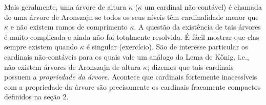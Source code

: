 \documentclass[a4paper]{article}
\theoremstyle{plain}\newtheorem{teo}{Teorema}[section]
\theoremstyle{plain}\newtheorem{prop}[teo]{Proposição}
\theoremstyle{plain}\newtheorem{lem}[teo]{Lema}
\theoremstyle{plain}\newtheorem{cor}[teo]{Corolário}
\theoremstyle{definition}\newtheorem{defi}[teo]{Definição}
\theoremstyle{remark}\newtheorem{rem}[teo]{Observação}
\theoremstyle{definition}\newtheorem{example}[teo]{Exemplo}
\theoremstyle{remark}\newtheorem{step}{\bf Step}
\begin{document}
Mais geralmente, uma árvore de altura $\kappa$ ($\kappa$ um cardinal não-contável) é chamada de uma árvore de Aronszajn se todos os seus níveis têm cardinalidade menor que $\kappa$ e não existem ramos de comprimento $\kappa$. A questão da existência de tais árvores é muito complicada e ainda não foi totalmente resolvida. É fácil mostrar que elas sempre existem quando $\kappa$ é singular (exercício). São de interesse particular os cardinais não-contáveis para os quais vale um análogo do Lema de Kőnig, i.e., não existem árvores de Aronszajn de altura $\kappa$; dizemos que tais cardinais possuem a \textit{propriedade da árvore}. Acontece que cardinais fortemente inacessíveis com a propriedade da árvore são precisamente os cardinais fracamente compactos definidos na seção 2.
  
  
  
\end{document}
